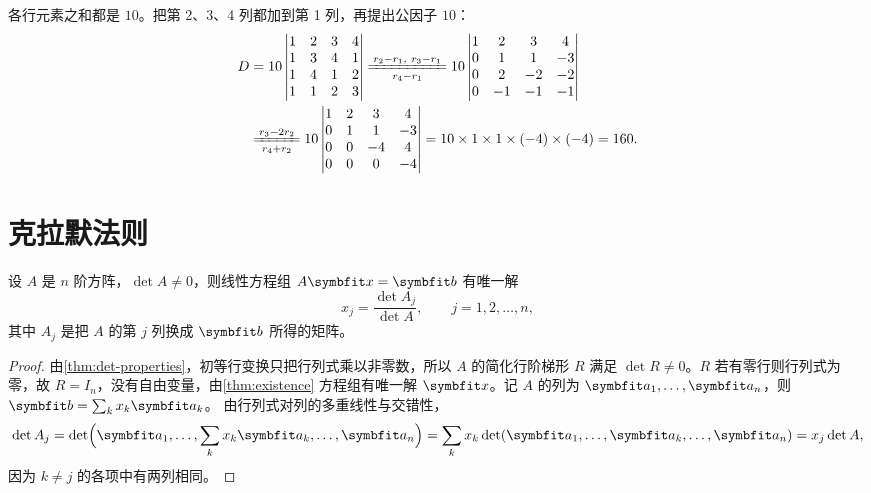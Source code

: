 \begin{solution}
各行元素之和都是 $10$。把第 2、3、4 列都加到第 1 列，再提出公因子 $10$：
\begin{align*}
D&=10\begin{vmatrix}1&2&3&4\\1&3&4&1\\1&4&1&2\\1&1&2&3\end{vmatrix}
\xlongequal[r_4-r_1]{r_2-r_1,\ r_3-r_1}
10\begin{vmatrix}1&2&3&4\\0&1&1&-3\\0&2&-2&-2\\0&-1&-1&-1\end{vmatrix}\\
&\xlongequal[r_4+r_2]{r_3-2r_2}
10\begin{vmatrix}1&2&3&4\\0&1&1&-3\\0&0&-4&4\\0&0&0&-4\end{vmatrix}
=10\times1\times1\times(-4)\times(-4)=160 .
\end{align*}
\end{solution}

\section{克拉默法则}\label{sec:cramer}

\begin{theorem}[克拉默法则]\label{thm:cramer}
设 $A$ 是 $n$ 阶方阵，$\det A\ne0$，则线性方程组 $A\vb{x}=\vb{b}$ 有唯一解
\begin{equation}\label{eq:cramer}
  x_j=\frac{\det A_j}{\det A},\qquad j=1,2,\dotsc,n,
\end{equation}
其中 $A_j$ 是把 $A$ 的第 $j$ 列换成 $\vb{b}$ 所得的矩阵。
\end{theorem}

\begin{proof}
由\cref{thm:det-properties}，初等行变换只把行列式乘以非零数，所以 $A$ 的简化行阶梯形 $R$
满足 $\det R\ne0$。$R$ 若有零行则行列式为零，故 $R=I_n$，没有自由变量，由\cref{thm:existence}
方程组有唯一解 $\vb{x}$。记 $A$ 的列为 $\vb{a}_1,\dotsc,\vb{a}_n$，则 $\vb{b}=\sum_kx_k\vb{a}_k$。
由行列式对列的多重线性与交错性，
\[
  \det A_j=\det\Bigl(\vb{a}_1,\dotsc,\sum_kx_k\vb{a}_k,\dotsc,\vb{a}_n\Bigr)
  =\sum_kx_k\det(\vb{a}_1,\dotsc,\vb{a}_k,\dotsc,\vb{a}_n)=x_j\det A ,
\]
因为 $k\ne j$ 的各项中有两列相同。
\end{proof}


